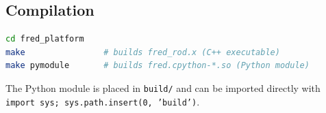 \documentclass[11pt,a4paper]{article}
\begin{document}
\subsection{Compilation}

\begin{lstlisting}[language=bash]
cd fred_platform
make                # builds fred_rod.x (C++ executable)
make pymodule       # builds fred.cpython-*.so (Python module)
\end{lstlisting}

The Python module is placed in \texttt{build/} and can be imported directly
with \texttt{import sys; sys.path.insert(0, 'build')}.
\end{document}
